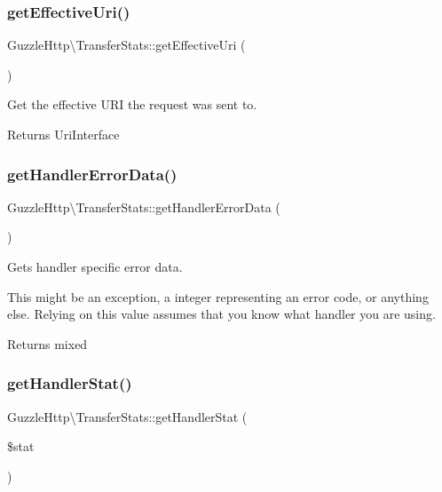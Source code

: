 \subsubsection{\texorpdfstring{get\+Effective\+Uri()}{getEffectiveUri()}}
{\footnotesize\ttfamily Guzzle\+Http\textbackslash{}\+Transfer\+Stats\+::get\+Effective\+Uri (\begin{DoxyParamCaption}{ }\end{DoxyParamCaption})}

Get the effective U\+RI the request was sent to.

\begin{DoxyReturn}{Returns}
Uri\+Interface 
\end{DoxyReturn}
\mbox{\label{classGuzzleHttp_1_1TransferStats_a4c8e144bc31ee3cf663a1cd0f47b3f19}} 
\subsubsection{\texorpdfstring{get\+Handler\+Error\+Data()}{getHandlerErrorData()}}
{\footnotesize\ttfamily Guzzle\+Http\textbackslash{}\+Transfer\+Stats\+::get\+Handler\+Error\+Data (\begin{DoxyParamCaption}{ }\end{DoxyParamCaption})}

Gets handler specific error data.

This might be an exception, a integer representing an error code, or anything else. Relying on this value assumes that you know what handler you are using.

\begin{DoxyReturn}{Returns}
mixed 
\end{DoxyReturn}
\mbox{\label{classGuzzleHttp_1_1TransferStats_af728e7a8e8f3f57889fdf037e1d1b11c}} 
\subsubsection{\texorpdfstring{get\+Handler\+Stat()}{getHandlerStat()}}
{\footnotesize\ttfamily Guzzle\+Http\textbackslash{}\+Transfer\+Stats\+::get\+Handler\+Stat (\begin{DoxyParamCaption}\item[{}]{\$stat }\end{DoxyParamCaption})}

